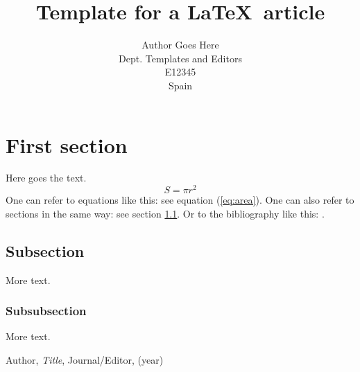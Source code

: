 \documentclass{article}
\title{Template for a \LaTeX\ article}
\author{Author Goes Here\\
  \small Dept. Templates and Editors\\
    \small E12345\\
	  \small Spain
	  }
\theoremstyle{definition}
\theoremstyle{remark}
\begin{document}
	  \maketitle


	  \section{First section}

	  Here goes the text.
	  \begin{equation}\label{eq:area}
	    S = \pi r^2
		\end{equation}
		One can refer to equations like this: see equation (\ref{eq:area}). One can also
		refer to sections in the same way: see section \ref{sec:nothing}. Or
		to the bibliography like this: \cite{Cd94}.

		\subsection{Subsection}\label{sec:nothing}

		More text.

		\subsubsection{Subsubsection}\label{sec:nothing2}

		More text.

		\begin{thebibliography}{99}

		 Author, \emph{Title}, Journal/Editor, (year)

		\end{thebibliography}

		
\end{document}
